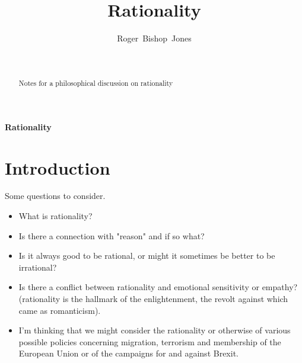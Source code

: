 \documentclass[12pt,titlepage]{article}
\title{Rationality}
\author{Roger~Bishop~Jones}
\date{\ }
\begin{document}
                               
\begin{titlepage}
\maketitle

\begin{abstract}
Notes for a philosophical discussion on rationality
\end{abstract}





\end{titlepage}

\setcounter{tocdepth}{2}
{\parskip-0pt\tableofcontents}



\pagebreak

\begin{centering}
{\LARGE \bf Rationality}
\end{centering}

\section{Introduction}

Some questions to consider.

\begin{itemize}
\item What is rationality?
\item Is there a connection with "reason" and if so what?
\item Is it always good to be rational, or might it sometimes be better to be
irrational?
\item Is there a conflict between rationality and emotional sensitivity or
empathy?
(rationality is the hallmark of the enlightenment, the revolt against
which came as romanticism).
\item I'm thinking that we might consider the rationality or otherwise of various
possible policies concerning migration, terrorism and membership of the
European Union or of the campaigns for and against Brexit.
\end{itemize}
\end{document}
